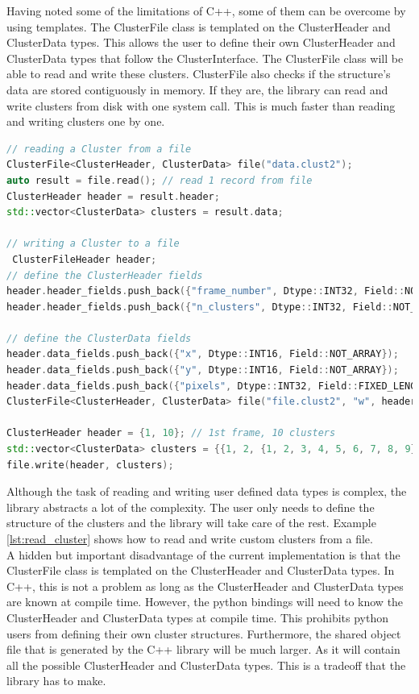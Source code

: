\documentclass[./chapitre3.tex]{subfiles}
\begin{document}
Having noted some of the limitations of C++, some of them can be overcome by using templates.
The ClusterFile class is templated on the ClusterHeader and ClusterData types. This allows
the user to define their own ClusterHeader and ClusterData types that follow the ClusterInterface.
The ClusterFile class will be able to read and write these clusters. ClusterFile also
checks if the structure's data are stored contiguously in memory. If they are, the library
can read and write clusters from disk with one system call. This is much faster than reading
and writing clusters one by one.\\

\begin{lstlisting}[language=C++, caption={Example: Reading and writing a Cluster from a file},label={lst:read_cluster}]
// reading a Cluster from a file
ClusterFile<ClusterHeader, ClusterData> file("data.clust2");
auto result = file.read(); // read 1 record from file
ClusterHeader header = result.header;
std::vector<ClusterData> clusters = result.data;

// writing a Cluster to a file
 ClusterFileHeader header;
// define the ClusterHeader fields
header.header_fields.push_back({"frame_number", Dtype::INT32, Field::NOT_ARRAY});
header.header_fields.push_back({"n_clusters", Dtype::INT32, Field::NOT_ARRAY});

// define the ClusterData fields
header.data_fields.push_back({"x", Dtype::INT16, Field::NOT_ARRAY});
header.data_fields.push_back({"y", Dtype::INT16, Field::NOT_ARRAY});
header.data_fields.push_back({"pixels", Dtype::INT32, Field::FIXED_LENGTH_ARRAY, 9});
ClusterFile<ClusterHeader, ClusterData> file("file.clust2", "w", header);

ClusterHeader header = {1, 10}; // 1st frame, 10 clusters
std::vector<ClusterData> clusters = {{1, 2, {1, 2, 3, 4, 5, 6, 7, 8, 9}}};
file.write(header, clusters);
\end{lstlisting}


Although the task of reading and writing user defined data types is complex, the library
abstracts a lot of the complexity. The user only needs to define the structure of the clusters
and the library will take care of the rest. Example \ref{lst:read_cluster} shows how to read
and write custom clusters from a file.\\

A hidden but important disadvantage of the current implementation is that the ClusterFile
class is templated on the ClusterHeader and ClusterData types. In C++, this is not a problem
as long as the ClusterHeader and ClusterData types are known at compile time. However, the python
bindings will need to know the ClusterHeader and ClusterData types at compile time. This prohibits
python users from defining their own cluster structures. Furthermore, the shared object file
that is generated by the C++ library will be much larger. As it will contain all the possible
ClusterHeader and ClusterData types. This is a tradeoff that the library has to make.\\
\end{document}
